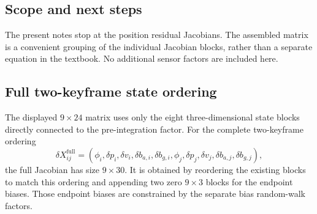 \documentclass[11pt,a4paper]{article}
\begin{document}
\subsection{Scope and next steps}
The present notes stop at the position residual
Jacobians. The assembled matrix is a convenient grouping
of the individual Jacobian blocks, rather than a separate equation
in the textbook. No additional sensor factors are included here.


\subsection{Full two-keyframe state ordering}
The displayed $9\times24$ matrix uses only the eight three-dimensional
state blocks directly connected to the pre-integration factor.
For the complete two-keyframe ordering
\begin{equation}
 \delta X_{ij}^{\mathrm{full}}=
 (\phi_i,\delta p_i,\delta v_i,\delta b_{a,i},\delta b_{g,i},
 \phi_j,\delta p_j,\delta v_j,\delta b_{a,j},\delta b_{g,j}),
\end{equation}
the full Jacobian has size $9\times30$. It is obtained by
reordering the existing blocks to match this ordering and appending
two zero $9\times3$ blocks for the endpoint biases. Those endpoint
biases are constrained by the separate bias random-walk factors.
\end{document}
